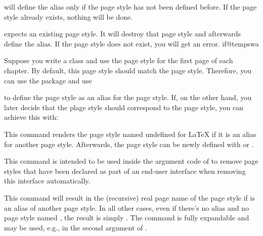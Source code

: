  will define the alias only if the
 page style has not been defined before. If the
 page style already exists, nothing will be done.

 expects an existing
 page style. It will destroy that page style and
afterwards define the alias. If the  page style
does not exist, you will get an error.%
%
\csname if@tempswa\endcsname%
  \begin{Example}
    Suppose you write a class and use the  page style for the
    first page of each chapter. By default, this page style should match the
     page style. Therefore, you can use the 
    package and use
\begin{lstcode}
\end{lstcode}
    to define the  page style as an alias for the
     page style. If, on the other hand, you later decide that
    the  plage style should correspond to the
     page style, you can achieve this with:
\begin{lstcode}
\end{lstcode}%
  \end{Example}%
\fi
\EndIndexGroup


\begin{Declaration}
\end{Declaration}
%
%
This command renders the page style named  undefined
for \LaTeX{} if it is an alias for another page style. Afterwards, the page
style can be newly defined with
 or
. 

This command is intended to be used inside the argument code of
 to remove page styles
that have been declared as part of an end-user interface when removing this
interface automatically.%
\EndIndexGroup


\begin{Declaration}
\end{Declaration}
%
%
This command will result in the (recursive) real page name of the page style
if  is an alias of another page style. In all other
cases, even if there's no alias and no page style named , the result is simply . The command is fully
expandable and may be used, e.g., in the second argument of .%
\EndIndexGroup



